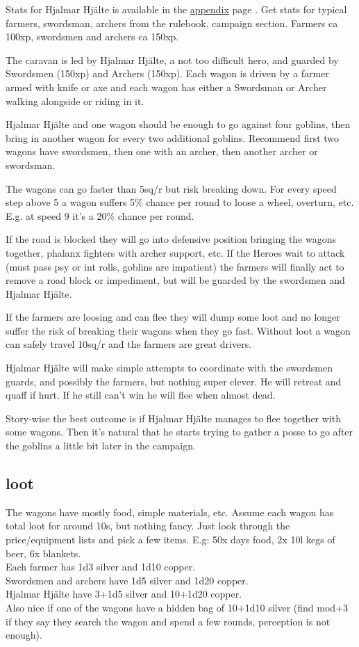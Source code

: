 Stats for Hjalmar Hjälte is available in the \hyperref[hjalmarhjalte]{appendix} page \pageref{hjalmarhjalte}. Get stats for typical farmers, swordsman, archers from the rulebook, campaign section. Farmers ca 100xp, swordsmen and archers ca 150xp.

The caravan is led by Hjalmar Hjälte, a not too difficult hero, and guarded by Swordsmen (150xp) and Archers (150xp). Each wagon is driven by a farmer armed with knife or axe and each wagon has either a Swordsman or Archer walking alongside or riding in it.

Hjalmar Hjälte and one wagon should be enough to go against four goblins, then bring in another wagon for every two additional goblins. Recommend first two wagons have swordsmen, then one with an archer, then another archer or swordsman.

The wagons can go faster than 5sq/r but risk breaking down. For every speed step above 5 a wagon suffers 5\% chance per round to loose a wheel, overturn, etc. E.g. at speed 9 it's a 20\% chance per round.

If the road is blocked they will go into defensive position bringing the wagons together, phalanx fighters with archer support, etc. If the Heroes wait to attack (must pass psy or int rolls, goblins are impatient) the farmers will finally act to remove a road block or impediment, but will be guarded by the swordsmen and Hjalmar Hjälte.

If the farmers are loosing and can flee they will dump some loot and no longer suffer the risk of breaking their wagons when they go fast. Without loot a wagon can safely travel 10sq/r and the farmers are great drivers.

Hjalmar Hjälte will make simple attempts to coordinate with the swordsmen guards, and possibly the farmers, but nothing super clever. He will retreat and quaff if hurt. If he still can't win he will flee when almost dead.

Story-wise the best outcome is if Hjalmar Hjälte manages to flee together with some wagons. Then it's natural that he starts trying to gather a posse to go after the goblins a little bit later in the campaign.


\subsection*{loot}

The wagons have mostly food, simple materials, etc. Assume each wagon has total loot for around 10s, but nothing fancy. Just look through the price/equipment lists and pick a few items. E.g: 50x days food, 2x 10l kegs of beer, 6x blankets.\\
Each farmer has 1d3 silver and 1d10 copper.\\
Swordsmen and archers have 1d5 silver and 1d20 copper.\\
Hjalmar Hjälte have 3+1d5 silver and 10+1d20 copper.\\
Also nice if one of the wagons have a hidden bag of 10+1d10 silver (find mod+3 if they say they search the wagon and spend a few rounds, perception is not enough).

